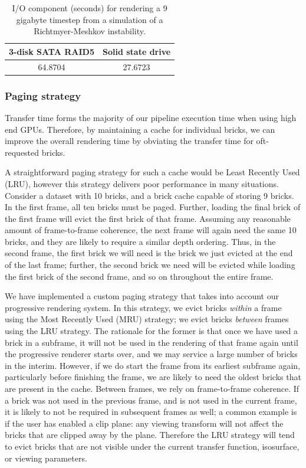 \begin{table}
	\begin{center}
	\begin{tabular}{|c|c|}\hline
	\textbf{3-disk SATA RAID5} & \textbf{Solid state drive}\\\hline
	64.8704 & 27.6723\\\hline
	\end{tabular}
	\end{center}

  \caption{I/O component (seconds) for rendering a 9 gigabyte timestep
  from a simulation of a Richtmyer-Meshkov instability.}
	\label{tbl:ssd}
\end{table}

\subsubsection{Paging strategy}

Transfer time forms the majority of our pipeline execution time when
using high end GPUs. Therefore, by maintaining a cache for individual
bricks, we can improve the overall rendering time by obviating the
transfer time for oft-requested bricks.

A straightforward paging strategy for such a cache would
be Least Recently Used (LRU), however this strategy delivers
poor performance in many situations. Consider a dataset
with 10 bricks, and a brick cache capable of storing 9 bricks.
In the first frame, all ten bricks must be paged. Further, loading
the final brick of the first frame will evict the first brick
of that frame. Assuming any reasonable amount of frame-to-frame
coherence, the next frame will again need the same 10
bricks, and they are likely to require a similar depth ordering.
Thus, in the second frame, the first brick we will need
is the brick we just evicted at the end of the last frame; further,
the second brick we need will be evicted while loading
the first brick of the second frame, and so on throughout the
entire frame.

We have implemented a custom paging strategy that
takes into account our progressive rendering system. In this
strategy, we evict bricks \emph{within} a frame using the Most Recently
Used (MRU) strategy; we evict bricks \emph{between} frames using the
LRU strategy. The rationale for the former is that once we have used a
brick in a subframe, it will not be used in the rendering of that frame
again until the progressive renderer starts over, and we may service
a large number of bricks in the interim. However, if we do start the
frame from its earliest subframe again, particularly before finishing
the frame, we are likely to need the oldest bricks that are present
in the cache. Between frames, we rely on frame-to-frame coherence. If
a brick was not used in the previous frame, and is not used in the
current frame, it is likely to not be required in subsequent frames as
well; a common example is if the user has enabled a clip plane: any
viewing transform will not affect the bricks that are clipped away by
the plane. Therefore the LRU strategy will tend to evict bricks that
are not visible under the current transfer function, isosurface, or
viewing parameters.

